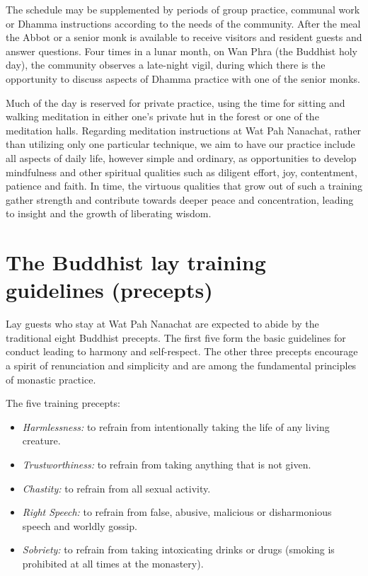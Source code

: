 The schedule may be supplemented by periods of group practice, communal
work or Dhamma instructions according to the needs of the community.
After the meal the Abbot or a senior monk is available to receive
visitors and resident guests and answer questions. Four times in a lunar
month, on Wan Phra (the Buddhist holy day), the community observes a
late-night vigil, during which there is the opportunity to discuss
aspects of Dhamma practice with one of the senior monks.

Much of the day is reserved for private practice, using the time for
sitting and walking meditation in either one's private hut in the forest
or one of the meditation halls. Regarding meditation instructions at Wat
Pah Nanachat, rather than utilizing only one particular technique, we
aim to have our practice include all aspects of daily life, however
simple and ordinary, as opportunities to develop mindfulness and other
spiritual qualities such as diligent effort, joy, contentment, patience
and faith. In time, the virtuous qualities that grow out of such a
training gather strength and contribute towards deeper peace and
concentration, leading to insight and the growth of liberating
wisdom.

\section{The Buddhist lay training guidelines (precepts)}

Lay guests who stay at Wat Pah Nanachat are expected to abide by the
traditional eight Buddhist precepts. The first five form the basic
guidelines for conduct leading to harmony and self-respect. The other
three precepts encourage a spirit of renunciation and simplicity and are
among the fundamental principles of monastic practice.

The five training precepts:

\begin{itemize}

  \item \emph{Harmlessness:} to refrain from intentionally taking the life of
    any living creature.

  \item \emph{Trustworthiness:} to refrain from taking anything that is not
    given.

  \item \emph{Chastity:} to refrain from all sexual activity.

  \item \emph{Right Speech:} to refrain from false, abusive, malicious or
    disharmonious speech and worldly gossip.

  \item \emph{Sobriety:} to refrain from taking intoxicating drinks or drugs
    (smoking is prohibited at all times at the monastery).
\end{itemize}

